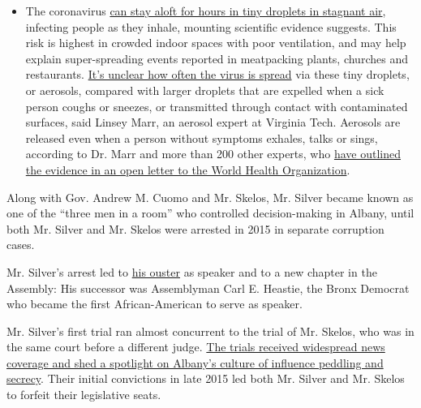 \begin{itemize}
  \begin{itemize}
  \tightlist
  \item
    The coronavirus
    \href{https://www.nytimes3xbfgragh.onion/2020/07/04/health/239-experts-with-one-big-claim-the-coronavirus-is-airborne.html?action=click\&pgtype=Article\&state=default\&region=MAIN_CONTENT_3\&context=storylines_faq}{can
    stay aloft for hours in tiny droplets in stagnant air}, infecting
    people as they inhale, mounting scientific evidence suggests. This
    risk is highest in crowded indoor spaces with poor ventilation, and
    may help explain super-spreading events reported in meatpacking
    plants, churches and restaurants.
    \href{https://www.nytimes3xbfgragh.onion/2020/07/06/health/coronavirus-airborne-aerosols.html?action=click\&pgtype=Article\&state=default\&region=MAIN_CONTENT_3\&context=storylines_faq}{It's
    unclear how often the virus is spread} via these tiny droplets, or
    aerosols, compared with larger droplets that are expelled when a
    sick person coughs or sneezes, or transmitted through contact with
    contaminated surfaces, said Linsey Marr, an aerosol expert at
    Virginia Tech. Aerosols are released even when a person without
    symptoms exhales, talks or sings, according to Dr. Marr and more
    than 200 other experts, who
    \href{https://academic.oup.com/cid/article/doi/10.1093/cid/ciaa939/5867798}{have
    outlined the evidence in an open letter to the World Health
    Organization}.
  \end{itemize}
\end{itemize}

Along with Gov. Andrew M. Cuomo and Mr. Skelos, Mr. Silver became known
as one of the ``three men in a room'' who controlled decision-making in
Albany, until both Mr. Silver and Mr. Skelos were arrested in 2015 in
separate corruption cases.

Mr. Silver's arrest led to
\href{https://www.nytimes3xbfgragh.onion/2015/01/29/nyregion/6-days-that-felled-sheldon-silver-the-speaker-who-ruled-albany-for-decades.html}{his
ouster} as speaker and to a new chapter in the Assembly: His successor
was Assemblyman Carl E. Heastie, the Bronx Democrat who became the first
African-American to serve as speaker.

Mr. Silver's first trial ran almost concurrent to the trial of Mr.
Skelos, who was in the same court before a different judge.
\href{https://www.nytimes3xbfgragh.onion/2015/11/02/nyregion/in-two-corruption-cases-the-culture-of-albany-will-go-on-trial.html?searchResultPosition=15}{The
trials received widespread news coverage and shed a spotlight on
Albany's culture of influence peddling and secrecy}. Their initial
convictions in late 2015 led both Mr. Silver and Mr. Skelos to forfeit
their legislative seats.

